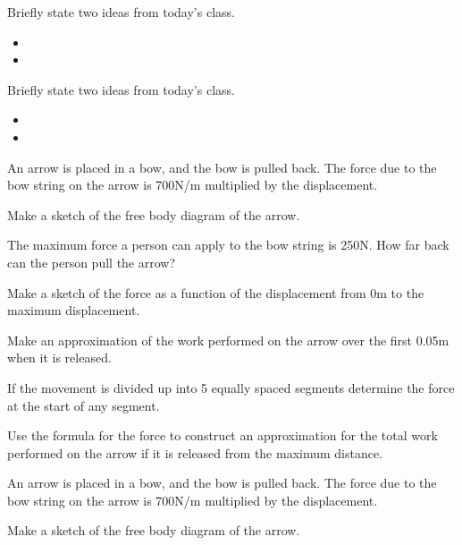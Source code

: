 \begin{problem}
\item Briefly state two ideas from today's class.
  \begin{itemize}
  \item
  \item
  \end{itemize}
  \item Briefly state two ideas from today's class.
    \begin{itemize}
    \item
    \item
    \end{itemize}
    \item An arrow is placed in a bow, and the bow is pulled back. The
      force due to the bow string on the arrow is 700N/m multiplied by the
      displacement.
      \begin{subproblem}
      \item Make a sketch of the free body diagram of the arrow.
        \vfill
      \item The maximum force a person can apply to the bow string is
        250N. How far back can the person pull the arrow?
        \vfill
      \item Make a sketch of the force as a function of the displacement
        from 0m to the maximum displacement.
        \vfill
        \clearpage
      \item Make an approximation of the work performed on the arrow over
        the first 0.05m when it is released.
        \vfill
      \item If the movement is divided up into 5 equally spaced segments
        determine the force at the start of any segment.
        \vfill
      \item Use the formula for the force to construct an approximation
        for the total work performed on the arrow if it is released from
        the maximum distance.
        \vfill
      \end{subproblem}
  \clearpage
  \item An arrow is placed in a bow, and the bow is pulled back. The
    force due to the bow string on the arrow is 700N/m multiplied by the
    displacement.
    \begin{subproblem}
    \item Make a sketch of the free body diagram of the arrow.

\end{subproblem}
\end{problem}
